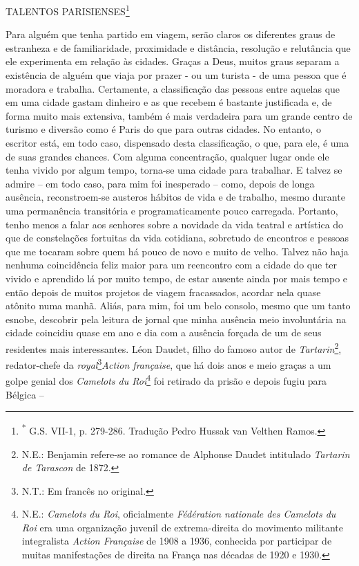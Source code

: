 TALENTOS PARISIENSES\footnote{\textsuperscript{*} G.S. VII-1, p.
  279-286. Tradução Pedro Hussak van Velthen Ramos.}

Para alguém que tenha partido em viagem, serão claros os diferentes
graus de estranheza e de familiaridade, proximidade e distância,
resolução e relutância que ele experimenta em relação às cidades. Graças
a Deus, muitos graus separam a existência de alguém que viaja por prazer
- ou um turista - de uma pessoa que é moradora e trabalha. Certamente, a
classificação das pessoas entre aquelas que em uma cidade gastam
dinheiro e as que recebem é bastante justificada e, de forma muito mais
extensiva, também é mais verdadeira para um grande centro de turismo e
diversão como é Paris do que para outras cidades. No entanto, o escritor
está, em todo caso, dispensado desta classificação, o que, para ele, é
uma de suas grandes chances. Com alguma concentração, qualquer lugar
onde ele tenha vivido por algum tempo, torna-se uma cidade para
trabalhar. E talvez se admire -- em todo caso, para mim foi inesperado
-- como, depois de longa ausência, reconstroem-se austeros hábitos de
vida e de trabalho, mesmo durante uma permanência transitória e
programaticamente pouco carregada. Portanto, tenho menos a falar aos
senhores sobre a novidade da vida teatral e artística do que de
constelações fortuitas da vida cotidiana, sobretudo de encontros e
pessoas que me tocaram sobre quem há pouco de novo e muito de velho.
Talvez não haja nenhuma coincidência feliz maior para um reencontro com
a cidade do que ter vivido e aprendido lá por muito tempo, de estar
ausente ainda por mais tempo e então depois de muitos projetos de viagem
fracassados, acordar nela quase atônito numa manhã. Aliás, para mim, foi
um belo consolo, mesmo que um tanto esnobe, descobrir pela leitura de
jornal que minha ausência meio involuntária na cidade coincidiu quase em
ano e dia com a ausência forçada de um de seus residentes mais
interessantes. Léon Daudet, filho do famoso autor de
\emph{Tartarin}\footnote{N.E.: Benjamin refere-se ao romance de Alphonse
  Daudet intitulado \emph{Tartarin de Tarascon} de 1872.}, redator-chefe
da \emph{royal}\footnote{N.T.: Em francês no original.}\emph{Action
française}, que há dois anos e meio graças a um golpe genial dos
\emph{Camelots du Roi}\footnote{N.E.: \emph{Camelots du Roi},
  oficialmente \emph{Fédération nationale des Camelots du Roi} era uma
  organização juvenil de extrema-direita do movimento militante
  integralista \emph{Action Française} de 1908 a 1936, conhecida por
  participar de muitas manifestações de direita na França nas décadas de
  1920 e 1930.} foi retirado da prisão e depois fugiu para Bélgica --
